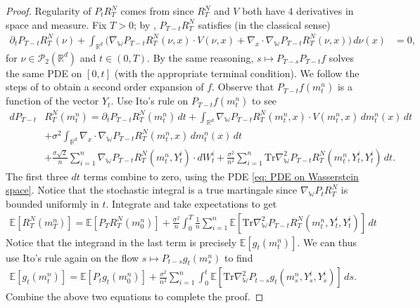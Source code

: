 \documentclass[11pt,reqno]{amsart}
\numberwithin{equation}{section}
\theoremstyle{definition}
\def\E{{\mathbb E}}
\def\R{{\mathbb R}}
\def\tr{\mathrm{Tr}}
\newcommand{\wgrad}{\nabla_{\W}}
\newcommand{\W}{\mathbb W}
\begin{document}
\begin{proof}
Regularity of $P_t R_T^N$ comes from \cite[Theorem 2.18]{Chassagneux2022-jt} since $R_T^N$ and $ V$ both have $4$ derivatives in space and measure. Fix $T>0$; by \cite[Theorem 7.2]{Buckdahn2017-op}, $P_{T-t}R^N_T $ satisfies (in the classical sense) 
\begin{align} 
        \partial_t P_{T-t}R_T^N(\nu)+ \int_{\R^d}\Big(\wgrad P_{T-t}R_T^N(\nu,x)\cdot  V(\nu,x)+\nabla_x \cdot \wgrad P_{T-t} R_T^N (\nu,x)\Big) \,d\nu(x)&=0, \label{eq: PDE on Wasserstein space}
\end{align}
for $\nu \in \mathcal P_2(\R^d)$ and $t \in (0,T)$.
By the same reasoning, $s\mapsto P_{T-s} P_{T-t} f$ solves the same PDE on $[0,t]$ (with the appropriate terminal condition).
    We follow the steps of \cite[Lemma 2.11(ii)]{Chassagneux2022-jt} to obtain a second order expansion of $f$. Observe that $P_{T-t} f(m_t^n)$ is a function of the vector $Y_t$. Use Ito's rule on $P_{T-t} f (m_t^n)$ to see
    \begin{align*}
        dP_{T-t} &R_T^N(m_t^n)=\partial_t P_{T-t} R_T^N(m_t^n)\,dt+\int_{\R^d} \wgrad P_{T-t} R_T^N(m_t^n,x)\cdot  V(m_t^n,x)\,dm_t^n(x)\,dt\\
        &+\sigma^2\int_{\R^d}\nabla_x\cdot \wgrad P_{T-t} R_T^N(m_t^n,x)\,dm_t^n(x)\,dt\\
        &+\frac{\sigma\sqrt2}{n}\sum_{i=1}^n \wgrad P_{T-t} R_T^N(m_t^n,Y_t^i)\cdot dW^i_t + \frac{\sigma^2}{n^2}\sum_{i=1}^n \tr\wgrad^2 P_{T-t} R_T^N(m_t^n,Y_t^i,Y_t^i)\,dt.
    \end{align*}
    The first three $dt$ terms combine to zero, using the PDE \eqref{eq: PDE on Wasserstein space}. Notice that the stochastic integral is a true martingale since $\wgrad P_{t} R_T^N$ is bounded uniformly in $t$. Integrate and take expectations to get  
\begin{align*}
    \E[R_T^N(m_T^n)]=\E[P_T R_T^N(m_0^n)]+\frac{\sigma^2}{n} \int_0^T \frac{1}{n}\sum_{i=1}^n \E[ \tr\wgrad^2P_{T-t} R_T^N(m_t^n,Y_t^i,Y_t^i)]\,dt
\end{align*}
Notice that the integrand in the last term is precisely $\E[g_t(m_t^n)]$.
We can thus use Ito's rule again on the flow $s\mapsto P_{t-s} g_t(m_s^n)$ to find
\begin{align*}
\E[g_t(m_t^n)] = \E[P_t g_t(m_0^n)]+\frac{\sigma^2}{n^2}\sum_{i=1}^n \int_0^t\E[ \tr\wgrad^2 P_{t-s} g_{t}(m_s^n,Y_s^i,Y_s^i)]\,ds.
\end{align*}
Combine the above two equations to complete the proof.
\end{proof}
\end{document}
